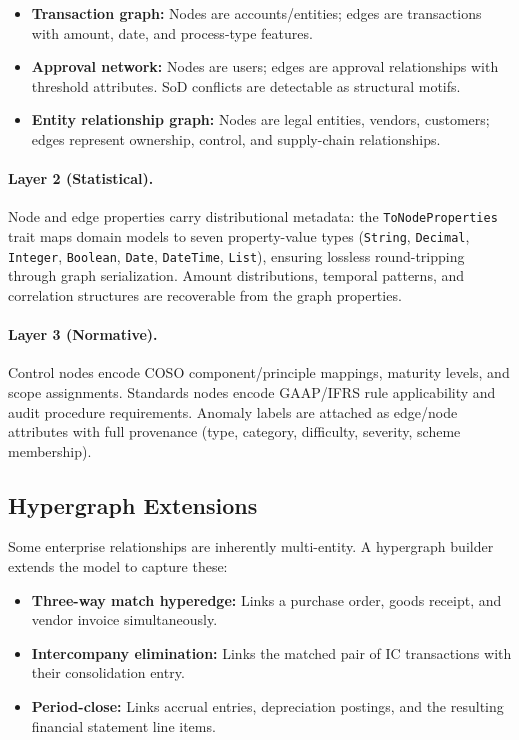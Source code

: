 \begin{itemize}
  \item \textbf{Transaction graph:} Nodes are accounts/entities; edges
    are transactions with amount, date, and process-type features.
  \item \textbf{Approval network:} Nodes are users; edges are approval
    relationships with threshold attributes.  SoD conflicts are
    detectable as structural motifs.
  \item \textbf{Entity relationship graph:} Nodes are legal entities,
    vendors, customers; edges represent ownership, control, and
    supply-chain relationships.
\end{itemize}

\paragraph{Layer 2 (Statistical).}
Node and edge properties carry distributional metadata: the
\texttt{ToNode\-Properties} trait maps domain models to seven
property-value types
(\texttt{String}, \texttt{Decimal}, \texttt{Integer},
\texttt{Boolean}, \texttt{Date}, \texttt{Date\-Time}, \texttt{List}),
ensuring lossless round-tripping through graph serialization.
Amount distributions, temporal patterns, and correlation structures
are recoverable from the graph properties.

\paragraph{Layer 3 (Normative).}
Control nodes encode COSO component/principle mappings, maturity
levels, and scope assignments.  Standards nodes encode GAAP/IFRS rule
applicability and audit procedure requirements.  Anomaly labels are
attached as edge/node attributes with full provenance (type, category,
difficulty, severity, scheme membership).

\subsection{Hypergraph Extensions}
\label{sec:kg_hypergraph}

Some enterprise relationships are inherently multi-entity.  A hypergraph
builder extends the model to capture these:

\begin{itemize}
  \item \textbf{Three-way match hyperedge:} Links a purchase order,
    goods receipt, and vendor invoice simultaneously.
  \item \textbf{Intercompany elimination:} Links the matched pair of IC
    transactions with their consolidation entry.
  \item \textbf{Period-close:} Links accrual entries, depreciation
    postings, and the resulting financial statement line items.
\end{itemize}

